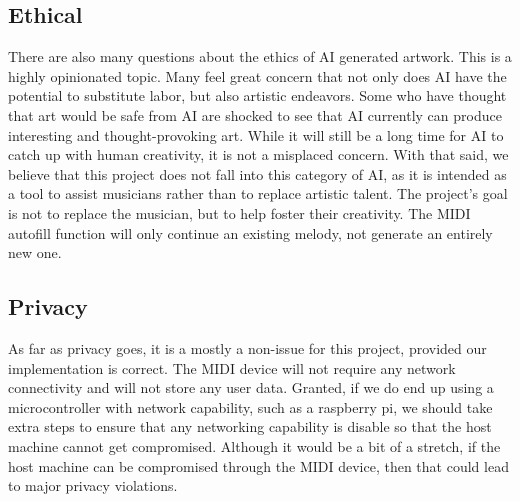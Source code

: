 \subsection{Ethical}

There are also many questions about the ethics of AI generated artwork. This is a highly
opinionated topic. Many feel great concern that not only does AI have the potential to
substitute labor, but also artistic endeavors. Some who have thought that art would be
safe from AI are shocked to see that AI currently can produce interesting and
thought-provoking art. While it will still be a long time for AI to catch up with human
creativity, it is not a misplaced concern. With that said, we believe that this project
does not fall into this category of AI, as it is intended as a tool to assist musicians
rather than to replace artistic talent. The project’s goal is not to replace the musician,
but to help foster their creativity. The MIDI autofill function will only continue an
existing melody, not generate an entirely new one.

\subsection{Privacy}

As far as privacy goes, it is a mostly a non-issue for this project, provided our
implementation is correct. The MIDI device will not require any network connectivity and
will not store any user data. Granted, if we do end up using a microcontroller with
network capability, such as a raspberry pi, we should take extra steps to ensure that any
networking capability is disable so that the host machine cannot get compromised. Although
it would be a bit of a stretch, if the host machine can be compromised through the MIDI
device, then that could lead to major privacy violations.